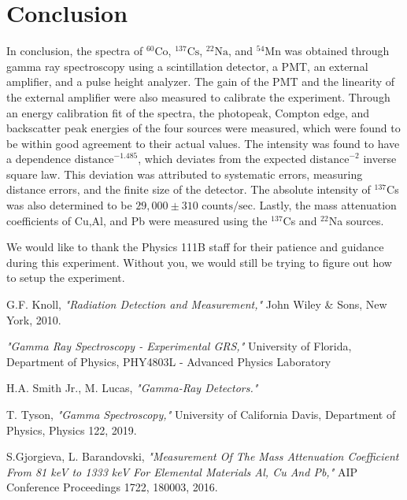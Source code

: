 \documentclass[%
 aip,
rsi,%
 amsmath,amssymb,
 reprint,%
author-numerical,%
]{revtex4-1}
\begin{document}
\section{Conclusion}
In conclusion, the spectra of $\mathrm { ^ { 60 }Co}  $, $\mathrm {  ^ { 137 }Cs }$, $\mathrm { ^ { 22 }Na }$, and $\mathrm { ^ { 54 }Mn } $ was obtained through gamma ray spectroscopy using a scintillation detector, a PMT, an external amplifier, and a pulse height analyzer. The gain of the PMT and the linearity of the external amplifier were also measured to calibrate the experiment. Through an energy calibration fit of the spectra, the photopeak, Compton edge, and backscatter peak energies of the four sources were measured, which were found to be within good agreement to their actual values. The intensity was found to have a dependence $\text{distance}^{-1.485}$, which deviates from the expected $\text{distance}^{-2}$ inverse square law. This deviation was attributed to systematic errors, measuring distance errors, and the finite size of the detector. The absolute intensity of $^ {137 }$Cs was also determined to be $29,000\pm310 \text{ counts/sec}$. Lastly, the mass attenuation coefficients of Cu,Al, and Pb were measured using the $^ {137 }$Cs and $^ {22 }$Na sources.



\begin{acknowledgments}
We would like to thank the Physics 111B staff for their patience and guidance during this experiment. Without you, we would still be trying to figure out how to setup the experiment. \newline

\end{acknowledgments}
 

\nocite{*}

 \begin{thebibliography}{1}
 

 G.F. Knoll, {\em "Radiation Detection and Measurement,"} John Wiley \& Sons, New York, 2010. \newline

   {\em "Gamma Ray Spectroscopy - Experimental GRS," } University of Florida, Department of Physics,
PHY4803L - Advanced Physics Laboratory \newline

 H.A. Smith Jr., M. Lucas, {\em "Gamma-Ray Detectors." } \newline

  T. Tyson,  {\em "Gamma Spectroscopy," } University of California Davis, Department of Physics, Physics 122, 2019. \newline

  S.Gjorgieva, L. Barandovski,  {\em "Measurement Of The Mass Attenuation Coefficient From 81
keV to 1333 keV For Elemental Materials Al, Cu And Pb," } AIP Conference Proceedings 1722, 180003, 2016. \newline




  \end{thebibliography}
\end{document}
